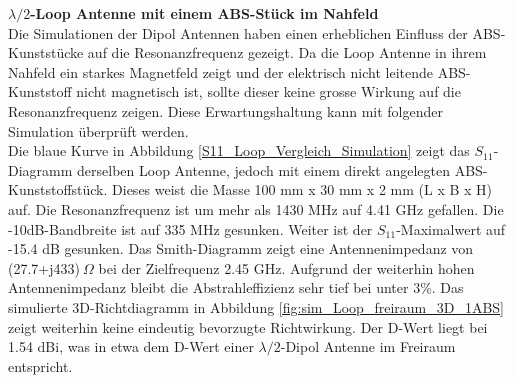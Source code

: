 \textbf{$\lambda/2$-Loop Antenne mit einem ABS-Stück im Nahfeld}\\
Die Simulationen der Dipol Antennen haben einen erheblichen Einfluss der ABS-Kunststücke auf die Resonanzfrequenz gezeigt. Da die Loop Antenne in ihrem Nahfeld ein starkes Magnetfeld zeigt und der elektrisch nicht leitende ABS-Kunststoff nicht magnetisch ist, sollte dieser keine grosse Wirkung auf die Resonanzfrequenz zeigen. Diese Erwartungshaltung kann mit folgender Simulation überprüft werden.\\ Die blaue Kurve in Abbildung \ref{S11_Loop_Vergleich_Simulation} zeigt das $S_{11}$-Diagramm derselben Loop Antenne, jedoch mit einem direkt angelegten ABS-Kunststoffstück. Dieses weist die Masse 100 mm x 30 mm x 2 mm (L x B x H) auf. Die Resonanzfrequenz ist um mehr als 1430 MHz auf 4.41 GHz gefallen. Die -10dB-Bandbreite ist auf 335 MHz gesunken. Weiter ist der $S_{11}$-Maximalwert auf -15.4 dB gesunken. Das Smith-Diagramm zeigt eine Antennenimpedanz von (27.7+j433)$\ \Omega$ bei der Zielfrequenz 2.45 GHz. Aufgrund der weiterhin hohen Antennenimpedanz bleibt die Abstrahleffizienz sehr tief bei unter $3\%$. Das simulierte 3D-Richtdiagramm in Abbildung \ref{fig:sim_Loop_freiraum_3D_1ABS} zeigt weiterhin keine eindeutig bevorzugte Richtwirkung. Der D-Wert liegt bei 1.54 dBi, was in etwa dem D-Wert einer $\lambda/2$-Dipol Antenne im Freiraum entspricht.\\




